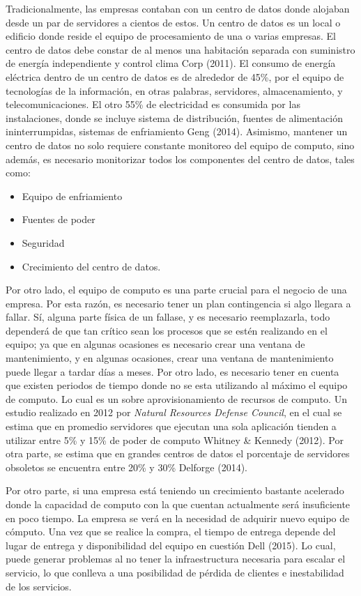 \documentclass[12pt,twoside]{reedthesis}
\providecommand{\tightlist}{%
  \setlength{\itemsep}{0pt}\setlength{\parskip}{0pt}}
\theoremstyle{definition}
\theoremstyle{definition}
\theoremstyle{definition}
\theoremstyle{remark}
\begin{document}
Tradicionalmente, las empresas contaban con un centro de datos donde
alojaban desde un par de servidores a cientos de estos. Un centro de
datos es un local o edificio donde reside el equipo de procesamiento de
una o varias empresas. El centro de datos debe constar de al menos una
habitación separada con suministro de energía independiente y control
clima Corp (2011). El consumo de energía eléctrica dentro de un centro
de datos es de alrededor de 45\%, por el equipo de tecnologías de la
información, en otras palabras, servidores, almacenamiento, y
telecomunicaciones. El otro 55\% de electricidad es consumida por las
instalaciones, donde se incluye sistema de distribución, fuentes de
alimentación ininterrumpidas, sistemas de enfriamiento Geng (2014).
Asimismo, mantener un centro de datos no solo requiere constante
monitoreo del equipo de computo, sino además, es necesario monitorizar
todos los componentes del centro de datos, tales como:
\begin{itemize}
\tightlist
\item
  Equipo de enfriamiento
\item
  Fuentes de poder
\item
  Seguridad
\item
  Crecimiento del centro de datos.
\end{itemize}
Por otro lado, el equipo de computo es una parte crucial para el negocio
de una empresa. Por esta razón, es necesario tener un plan contingencia
si algo llegara a fallar. Sí, alguna parte física de un fallase, y es
necesario reemplazarla, todo dependerá de que tan crítico sean los
procesos que se estén realizando en el equipo; ya que en algunas
ocasiones es necesario crear una ventana de mantenimiento, y en algunas
ocasiones, crear una ventana de mantenimiento puede llegar a tardar días
a meses. Por otro lado, es necesario tener en cuenta que existen
periodos de tiempo donde no se esta utilizando al máximo el equipo de
computo. Lo cual es un sobre aprovisionamiento de recursos de computo.
Un estudio realizado en 2012 por \emph{Natural Resources Defense
Council}, en el cual se estima que en promedio servidores que ejecutan
una sola aplicación tienden a utilizar entre 5\% y 15\% de poder de
computo Whitney \& Kennedy (2012). Por otra parte, se estima que en
grandes centros de datos el porcentaje de servidores obsoletos se
encuentra entre 20\% y 30\% Delforge (2014).

Por otro parte, si una empresa está teniendo un crecimiento bastante
acelerado donde la capacidad de computo con la que cuentan actualmente
será insuficiente en poco tiempo. La empresa se verá en la necesidad de
adquirir nuevo equipo de cómputo. Una vez que se realice la compra, el
tiempo de entrega depende del lugar de entrega y disponibilidad del
equipo en cuestión Dell (2015). Lo cual, puede generar problemas al no
tener la infraestructura necesaria para escalar el servicio, lo que
conlleva a una posibilidad de pérdida de clientes e inestabilidad de los
servicios.
\end{document}
